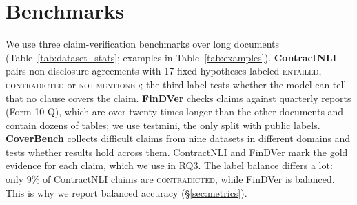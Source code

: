 \documentclass[11pt]{article}
\begin{document}
\section{Benchmarks}
\label{sec:benchmarks}

\begin{table}[!t]
\centering
\footnotesize
\setlength{\tabcolsep}{3pt}
\caption{Benchmark statistics. Labels: E = entailed, C = contradicted,
N = not mentioned, S = supported, R = refuted (not supported). Multi-hop
rates are over claims with evidence. Full statistics are in
Table~\ref{tab:dataset_stats_full} and examples in
Table~\ref{tab:examples} (Appendix~\ref{sec:appendix}).}
\label{tab:dataset_stats}
\end{table}

We use three claim-verification benchmarks over long documents
(Table~\ref{tab:dataset_stats}; examples in Table~\ref{tab:examples}).
\textbf{ContractNLI} \citep{koreeda-manning-2021-contractnli} pairs
non-disclosure agreements with 17 fixed hypotheses labeled
\textsc{entailed}, \textsc{contradicted} or \textsc{not\,mentioned}; the
third label tests whether the model can tell that no clause covers the
claim. \textbf{FinDVer} \citep{zhao-etal-2024-findver} checks claims
against quarterly reports (Form 10-Q), which are over twenty times longer
than the other documents and contain dozens of tables; we use testmini,
the only split with public labels. \textbf{CoverBench}
\citep{jacovi2024coverbench} collects difficult claims from nine datasets
in different domains and tests whether results hold across them.
ContractNLI and FinDVer mark the gold evidence for each claim, which we
use in RQ3. The label balance differs a lot: only 9\% of ContractNLI
claims are \textsc{contradicted}, while FinDVer is balanced. This is why we
report balanced accuracy (\S\ref{sec:metrics}).
\end{document}
